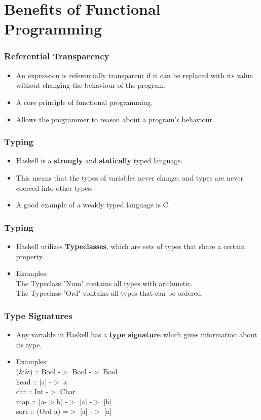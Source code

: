 \documentclass[presentation.tex]{subfiles}
\begin{document}
\section{Benefits of Functional Programming}
\begin{frame}
  \frametitle{Referential Transparency}
    	\begin{itemize}
 	\item An expression is referentially transparent if it can be replaced with its value without changing the behaviour of the program.\\
	\item A core principle of functional programming. \\
	\item Allows the programmer to reason about a program's behaviour.
	  	\end{itemize}
\end{frame}


\begin{frame}
  \frametitle{Typing}
     	\begin{itemize}
 	\item Haskell is a \textbf{strongly} and \textbf{statically} typed language. 
	\item This means that the types of variables never change, and types are never coerced into other types.
		\item A good example of a weakly typed language is C.
	  	\end{itemize} 
\end{frame}

\begin{frame}
  \frametitle{Typing}
     	\begin{itemize}
 	\item Haskell utilizes \textbf{Typeclasses}, which are sets of types that share a certain property.
	\item Examples: \\
	The Typeclass "Num" contains all types with arithmetic. \\
	The Typeclass "Ord" contains all types that can be ordered.
	  	\end{itemize} 
\end{frame}

\begin{frame}
  \frametitle{Type Signatures}
     	\begin{itemize}
 	\item Any variable in Haskell has a \textbf{type signature} which gives information about its type.
	\item Examples: \\
	(\&\&) :: Bool -$>$ Bool -$>$ Bool \\
	head :: [a] -$>$ a \\
	chr :: Int -$>$ Char \\
	map :: (a-$>$b) -$>$ [a] -$>$ [b] \\
	sort :: (Ord a) =$>$ [a] -$>$ [a]
	  	\end{itemize} 
\end{frame}
\end{document}
